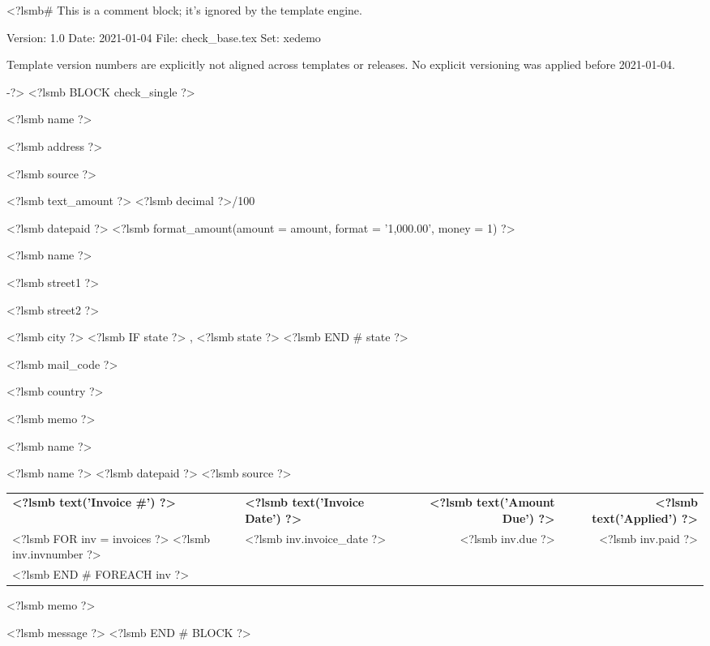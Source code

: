 <?lsmb#   This is a comment block; it's ignored by the template engine.

   Version:  1.0
   Date:     2021-01-04
   File:     check_base.tex
   Set:      xedemo

Template version numbers are explicitly not aligned across templates or
releases. No explicit versioning was applied before 2021-01-04.

-?>
<?lsmb BLOCK check_single ?>
\parbox[t]{12cm}{
  <?lsmb name ?>

  <?lsmb address ?>}
\hfill
\parbox[t]{6cm}{\hfill <?lsmb source ?>}

\vspace*{0.6cm}

<?lsmb text_amount ?> \dotfill <?lsmb decimal ?>/100 \makebox[0.5cm]{\hfill}

\vspace{0.5cm}

\hfill <?lsmb datepaid ?> \makebox[2cm]{\hfill} <?lsmb 
format_amount({amount = amount, format = '1,000.00', money = 1}) ?>


\vspace{0.5cm}

<?lsmb name ?>

<?lsmb street1 ?>

<?lsmb street2 ?>

<?lsmb city ?>
<?lsmb IF state ?>
\hspace{-0.1cm}, <?lsmb state ?>
<?lsmb END # state ?>

<?lsmb mail_code ?>

<?lsmb country ?>

\vspace{1.8cm}

<?lsmb memo ?>

\vspace{0.8cm}

<?lsmb name ?>

\vspace{0.5cm}

<?lsmb name ?> \hfill <?lsmb datepaid ?> \hfill <?lsmb source ?>

\vspace{0.5cm}
\begin{tabularx}{\textwidth}{lXrr@{}}
\textbf{<?lsmb text('Invoice #') ?>} & \textbf{<?lsmb text('Invoice Date') ?>}
  & \textbf{<?lsmb text('Amount Due') ?>} & \textbf{<?lsmb text('Applied') ?>} \\
<?lsmb FOR inv = invoices ?>
<?lsmb inv.invnumber ?> & <?lsmb inv.invoice_date ?> \dotfill
  & <?lsmb inv.due ?> & <?lsmb inv.paid ?> \\
<?lsmb END # FOREACH inv ?>
\end{tabularx}

\vspace{1cm}

<?lsmb memo ?>

\vfill
<?lsmb message ?>
<?lsmb END # BLOCK ?>
